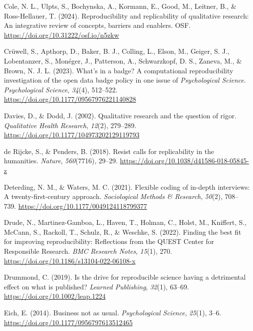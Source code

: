 \documentclass[authordate, meta]{jote-new-article}
\begin{document}
	Cole, N. L., Ulpts, S., Bochynska, A., Kormann, E., Good, M., Leitner, B., \& Ross-Hellauer, T. (2024). Reproducibility and replicability of qualitative research: An integrative review of concepts, barriers and enablers. OSF. \url{https://doi.org/10.31222/osf.io/n5zkw}



	Crüwell, S., Apthorp, D., Baker, B. J., Colling, L., Elson, M., Geiger, S. J., Lobentanzer, S., Monéger, J., Patterson, A., Schwarzkopf, D. S., Zaneva, M., \& Brown, N. J. L. (2023). What's in a badge? A computational reproducibility investigation of the open data badge policy in one issue of \emph{Psychological Science}. \emph{Psychological Science}, \emph{34}(4), 512--522. \url{https://doi.org/10.1177/09567976221140828}



	Davies, D., \& Dodd, J. (2002). Qualitative research and the question of rigor. \emph{Qualitative Health Research}, \emph{12}(2), 279--289. \url{https://doi.org/10.1177/104973202129119793}



	de Rijcke, S., \& Penders, B. (2018). Resist calls for replicability in the humanities. \emph{Nature}, \emph{560}(7716), 29--29. \url{https://doi.org/10.1038/d41586-018-05845-z}



	Deterding, N. M., \& Waters, M. C. (2021). Flexible coding of in-depth interviews: A twenty-first-century approach. \emph{Sociological Methods \& Research}, \emph{50}(2), 708--739. \url{https://doi.org/10.1177/0049124118799377}



	Drude, N., Martinez-Gamboa, L., Haven, T., Holman, C., Holst, M., Kniffert, S., McCann, S., Rackoll, T., Schulz, R., \& Weschke, S. (2022). Finding the best fit for improving reproducibility: Reflections from the QUEST Center for Responsible Research. \emph{BMC Research Notes}, \emph{15}(1), 270. \url{https://doi.org/10.1186/s13104-022-06108-x}



	Drummond, C. (2019). Is the drive for reproducible science having a detrimental effect on what is published? \emph{Learned Publishing}, \emph{32}(1), 63--69. \url{https://doi.org/10.1002/leap.1224}



	Eich, E. (2014). Business not as usual. \emph{Psychological Science}, \emph{25}(1), 3--6. \url{https://doi.org/10.1177/0956797613512465}
\end{document}
